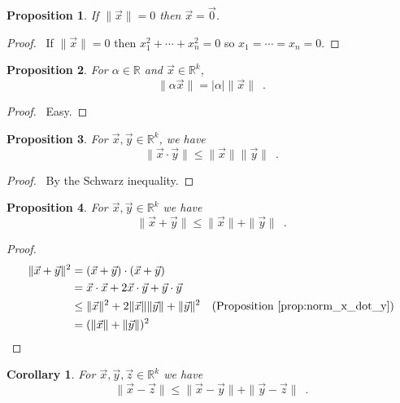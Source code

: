 \documentclass{book}
\let\qed\relax
\newtheorem{prop}{Proposition}[chapter]
\newtheorem{cor}{Corollary}[prop]
\theoremstyle{definition}
\begin{document}
\begin{prop}
If $\|\vec{x}\| = 0$ then $\vec{x} = \vec{0}$.
\end{prop}

\begin{proof}
\pf\ If $\|\vec{x}\| = 0$ then $x_1^2 + \cdots + x_n^2 = 0$ so $x_1 = \cdots = x_n = 0$. \qed
\end{proof}

\begin{prop}
For $\alpha \in \mathbb{R}$ and $\vec{x} \in \mathbb{R}^k$,
\[ \| \alpha \vec{x} \| = |\alpha| \| \vec{x} \| \enspace . \]
\end{prop}

\begin{proof}
\pf\ Easy. \qed
\end{proof}

\begin{prop}
\label{prop:norm_x_dot_y}
For $\vec{x}, \vec{y} \in \mathbb{R}^k$, we have
\[ \| \vec{x} \cdot \vec{y} \| \leq \| \vec{x} \| \| \vec{y} \| \enspace . \]
\end{prop}

\begin{proof}
\pf\ By the Schwarz inequality. \qed
\end{proof}

\begin{prop}
For $\vec{x}, \vec{y} \in \mathbb{R}^k$ we have
\[ \| \vec{x} + \vec{y} \| \leq \| \vec{x} \| + \| \vec{y} \| \enspace . \]
\end{prop}

\begin{proof}
\pf
\begin{align*}
\| \vec{x} + \vec{y} \|^2 & = (\vec{x} + \vec{y}) \cdot (\vec{x} + \vec{y}) \\
& = \vec{x} \cdot \vec{x} + 2 \vec{x} \cdot \vec{y} + \vec{y} \cdot \vec{y} \\
& \leq \| \vec{x} \|^2 + 2 \| \vec{x} \| \| \vec{y} \| + \| \vec{y} \|^2 & (\text{Proposition \ref{prop:norm_x_dot_y}}) \\
& = (\| \vec{x} \| + \| \vec{y} \|)^2 & \qed
\end{align*}
\end{proof}

\begin{cor}
\label{cor:triangle_inequality}
For $\vec{x}, \vec{y}, \vec{z} \in \mathbb{R}^k$ we have
\[ \| \vec{x} - \vec{z} \| \leq \| \vec{x} - \vec{y} \| + \| \vec{y} - \vec{z} \| \enspace . \]
\end{cor}
\end{document}
